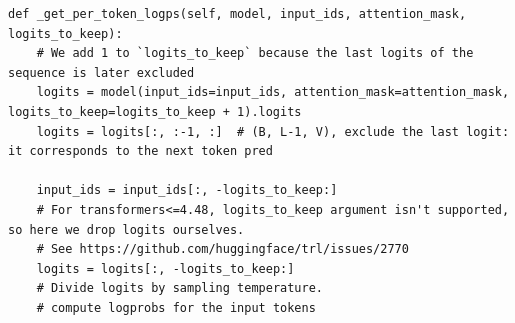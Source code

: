 \documentclass{article}
\begin{document}
\begin{verbatim}
def _get_per_token_logps(self, model, input_ids, attention_mask, logits_to_keep):
    # We add 1 to `logits_to_keep` because the last logits of the sequence is later excluded
    logits = model(input_ids=input_ids, attention_mask=attention_mask, logits_to_keep=logits_to_keep + 1).logits
    logits = logits[:, :-1, :]  # (B, L-1, V), exclude the last logit: it corresponds to the next token pred

    input_ids = input_ids[:, -logits_to_keep:]
    # For transformers<=4.48, logits_to_keep argument isn't supported, so here we drop logits ourselves.
    # See https://github.com/huggingface/trl/issues/2770
    logits = logits[:, -logits_to_keep:]
    # Divide logits by sampling temperature.
    # compute logprobs for the input tokens
\end{verbatim}
\end{document}
